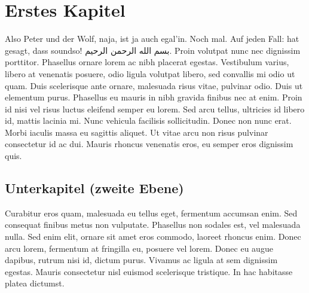 \documentclass[12pt,a4paper,parskip=half]{scrartcl}
\begin{document}

\OWmaketitle

\OWtoc


\section{Erstes Kapitel}

Also Peter und der Wolf, naja, ist ja auch egal'in. Noch mal. Auf jeden Fall: \cite{aghbari:nizwa-article} hat gesagt, dass soundso! \textarabic{بسم الله الرحمن الرحيم}. Proin volutpat nunc nec dignissim porttitor. Phasellus ornare lorem ac nibh placerat egestas. Vestibulum varius, libero at venenatis posuere, odio ligula volutpat libero, sed convallis mi odio ut quam. Duis scelerisque ante ornare, malesuada risus vitae, pulvinar odio. Duis ut elementum purus. Phasellus eu mauris in nibh gravida finibus nec at enim. Proin id nisi vel risus luctus eleifend semper eu lorem. Sed arcu tellus, ultricies id libero id, mattis lacinia mi. Nunc vehicula facilisis sollicitudin. Donec non nunc erat. Morbi iaculis massa eu sagittis aliquet. Ut vitae arcu non risus pulvinar consectetur id ac dui. Mauris rhoncus venenatis eros, eu semper eros dignissim quis.

\subsection{Unterkapitel (zweite Ebene)}

Curabitur eros quam, malesuada eu tellus eget, fermentum accumsan enim. Sed consequat finibus metus non vulputate. Phasellus non sodales est, vel malesuada nulla. Sed enim elit, ornare sit amet eros commodo, laoreet rhoncus enim. Donec arcu lorem, fermentum at fringilla eu, posuere vel lorem. Donec eu augue dapibus, rutrum nisi id, dictum purus. Vivamus ac ligula at sem dignissim egestas. Mauris consectetur nisl euismod scelerisque tristique. In hac habitasse platea dictumst.
\end{document}
